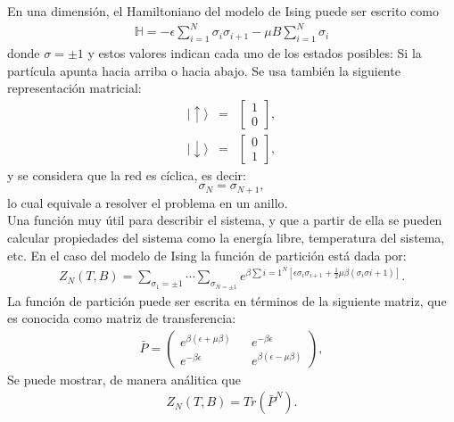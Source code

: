 \documentclass[portrait, a0b,final]{a0poster}%
\numberwithin{equation}{section}
\newenvironment{poster}{
  \begin{center}
  \begin{minipage}[c]{0.98\textwidth}
}{
  \end{minipage}
  \end{center}
}
\newenvironment{pcolumn}[1]{
  \begin{minipage}{#1\textwidth}
  \begin{center}
}{
  \end{center}
  \end{minipage}
}
\begin{document}
\begin{poster}
\begin{center}
\begin{pcolumn}{0.32}
{En una dimensi\'on, el Hamiltoniano del modelo de Ising puede ser escrito como \\
%
\begin{eqnarray}
  \mathbb{H}=-\epsilon\sum_{i=1}^{N}\sigma_i\sigma_{i+1}-\mu B\sum_{i=1}^{N}\sigma_i \label{hamilIsing}
\end{eqnarray}
%
donde $\sigma=\pm1$ y estos valores indican cada uno de los estados posibles: Si la part\'icula apunta hacia arriba o hacia abajo. Se usa tambi\'en la siguiente representaci\'on matricial:
%
\begin{eqnarray}
|\uparrow\rangle &=&\begin{bmatrix}1\\0\end{bmatrix}\label{spinup},\\
|\downarrow\rangle&=&\begin{bmatrix}0\\1\end{bmatrix}\label{spindown},
\end{eqnarray}
%
y se considera que la red es c\'iclica, es decir:
%
$$
\sigma_{N}=\sigma_{N+1},
$$
%
lo cual equivale a resolver el problema en un anillo.\\
Una funci\'on muy \'util para describir el sistema, y que a partir de ella se pueden calcular propiedades del sistema como la energ\'ia libre, temperatura del sistema, etc. En el caso del modelo de Ising la funci\'on de partici\'on est\'a dada por: 
%
\begin{eqnarray}
  Z_{N}(T,B)=\sum_{\sigma_{1}=\pm 1}\cdots\sum_{\sigma_{N=\pm 1}}e^{\beta\sum{i=1^N\left[\epsilon\sigma_{i}\sigma_{i+1}+\frac{1}{2}\mu \beta (\sigma_{i}\sigma{i+1}) \right]}} .\label{partising}
\end{eqnarray}
%
La funci\'on de partici\'on puede ser escrita en t\'erminos de la siguiente matriz, que es conocida como matriz de transferencia:
%
\begin{eqnarray}
\bar P= \begin{pmatrix}
e^{\beta(\epsilon + \mu \beta )} && e^{-\beta \epsilon} \\
e^{-\beta \epsilon} && e^{\beta(\epsilon - \mu \beta )}
\end{pmatrix},\label{matrizP}
\end{eqnarray}
%
Se puede mostrar, de manera an\'alitica que
%
\begin{eqnarray}
Z_N(T,B)= Tr(\bar P^N).
\end{eqnarray}
%



}
\end{pcolumn}
\end{center}
\end{poster}
\end{document}
